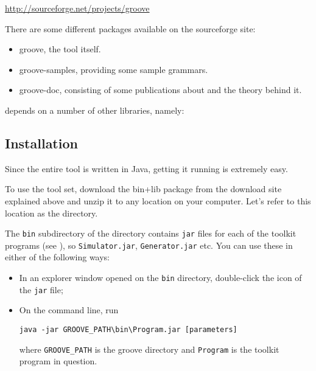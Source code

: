 \begin{center}
\url{http://sourceforge.net/projects/groove}
\end{center}
%
There are some different packages available on the sourceforge site:
%
\begin{itemize}[noitemsep]
\item \textsf{groove}, the tool itself.
\item \textsf{groove-samples}, providing some sample grammars.
\item \textsf{groove-doc}, consisting of some publications about \GROOVE and
  the theory behind it.
\end{itemize}
%
\GROOVE depends on a number of other libraries, namely:

\DTLsetseparator{;}

\begin{itemize}[noitemsep]
\end{itemize}

\subsection{Installation}

Since the entire \GROOVE tool is written in Java, getting it running is
extremely easy.

\medskip\noindent
To use the \GROOVE tool set, download the bin+lib package from the download
site explained above and unzip it to any location on your computer. Let's refer
to this location as the \GROOVE directory.

The \texttt{bin} subdirectory of the \GROOVE directory contains \texttt{jar}
files for each of the toolkit programs (see ), so
\texttt{Simulator.jar}, \texttt{Generator.jar} etc. You can use these in either of
the following ways:
\begin{itemize}
\item In an explorer window opened on the \texttt{bin} directory, double-click
  the icon of the \texttt{jar} file;
\item On the command line, run
%
\begin{verbatim}
java -jar GROOVE_PATH\bin\Program.jar [parameters]
\end{verbatim}
%
  where \texttt{GROOVE\_PATH} is the groove directory and \texttt{Program} is
  the toolkit program in question.
\end{itemize}
